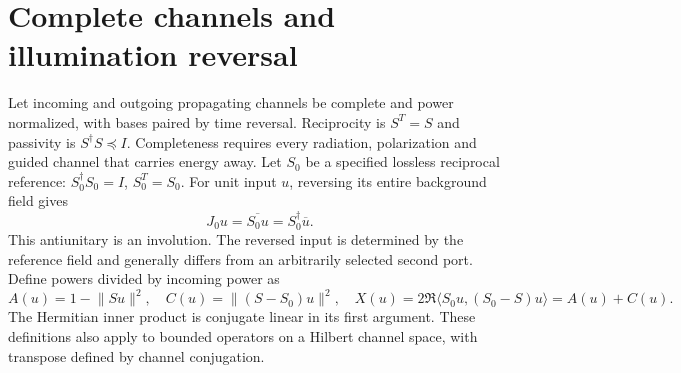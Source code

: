 \documentclass[11pt,a4paper]{article}
\theoremstyle{remark}
\newcommand{\norm}[1]{\lVert #1\rVert}
\newcommand{\ip}[2]{\langle #1,#2\rangle}
\begin{document}
\section{Complete channels and illumination reversal}\label{sec:channels}
Let incoming and outgoing propagating channels be complete and power normalized, with bases paired by time reversal. Reciprocity is $S^T=S$ and passivity is $S^\dagger S\preceq I$. Completeness requires every radiation, polarization and guided channel that carries energy away. Let $S_0$ be a specified lossless reciprocal reference: $S_0^\dagger S_0=I$, $S_0^T=S_0$. For unit input $u$, reversing its entire background field gives
\begin{equation}\label{eq:reverse}
 J_0u=\overline{S_0u}=S_0^\dagger\overline u.
\end{equation}
This antiunitary is an involution. The reversed input is determined by the reference field and generally differs from an arbitrarily selected second port. Define powers divided by incoming power as
\begin{equation}\label{eq:channel-powers}
 A(u)=1-\norm{Su}^2,\quad C(u)=\norm{(S-S_0)u}^2,\quad
 X(u)=2\Re\ip{S_0u}{(S_0-S)u}=A(u)+C(u).
\end{equation}
The Hermitian inner product is conjugate linear in its first argument. These definitions also apply to bounded operators on a Hilbert channel space, with transpose defined by channel conjugation.
\end{document}
